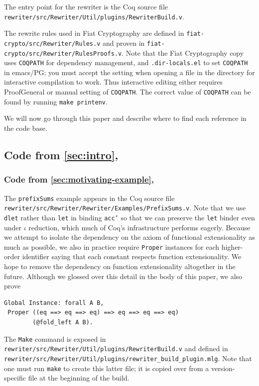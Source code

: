\begin{subappendices}
The entry point for the rewriter is the Coq source file \texttt{rewriter/src/Rewriter/Util/plugins/RewriterBuild.v}.

The rewrite rules used in Fiat Cryptography are defined in \texttt{fiat-crypto/src/Rewriter/Rules.v} and proven in \texttt{fiat-crypto/src/Rewriter/RulesProofs.v}.
Note that the Fiat Cryptography copy uses \verb|COQPATH| for dependency management, and \verb|.dir-locals.el| to set \verb|COQPATH| in emacs/PG; you must accept the setting when opening a file in the directory for interactive compilation to work.
Thus interactive editing either requires ProofGeneral or manual setting of \verb|COQPATH|.
The correct value of \verb|COQPATH| can be found by running \verb|make printenv|.

We will now go through this paper and describe where to find each reference in the code base.

\newcommand{\autocommanameref}[1]{\autoref{#1}, \nameref{#1}}

\subsection{Code from \autocommanameref{sec:intro}}

\subsubsection{Code from \autocommanameref{sec:motivating-example}}

The \texttt{prefixSums} example appears in the Coq source file \texttt{rewriter/src/Rewriter/Rewriter/Examples/PrefixSums.v}.
Note that we use \texttt{dlet} rather than \texttt{let} in binding \texttt{acc'} so that we can preserve the \texttt{let} binder even under $\iota$ reduction, which much of Coq's infrastructure performs eagerly.
Because we attempt to isolate the dependency on the axiom of functional extensionality as much as possible, we also in practice require \texttt{Proper} instances for each higher-order identifier saying that each constant respects function extensionality.
We hope to remove the dependency on function extensionality altogether in the future.
Although we glossed over this detail in the body of this paper, we also prove
\begin{verbatim}
Global Instance: forall A B,
 Proper ((eq ==> eq ==> eq) ==> eq ==> eq ==> eq)
        (@fold_left A B).
\end{verbatim}

The \texttt{Make} command is exposed in \texttt{rewriter/src/Rewriter/Util/plugins/RewriterBuild.v} and defined in \texttt{rewriter/src/Rewriter/Util/plugins/rewriter\_build\_plugin.mlg}.
Note that one must run \texttt{make} to create this latter file; it is copied over from a version-specific file at the beginning of the build.


\end{subappendices}
